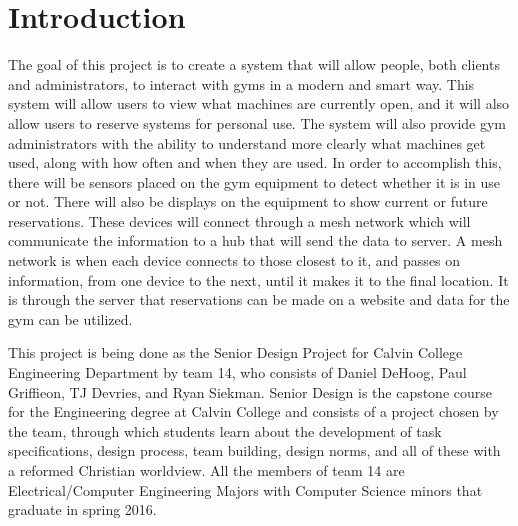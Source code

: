 \documentclass[ppfs.tex]{template/subfiles}
\begin{document}
\section{Introduction}

The goal of this project is to create a system that will allow people, both clients and administrators, to interact with gyms in a modern and smart way. This system will allow users to view what machines are currently open, and it will also allow users to reserve systems for personal use. The system will also provide gym administrators with the ability to understand more clearly what machines get used, along with how often and when they are used. In order to accomplish this, there will be sensors placed on the gym equipment to detect whether it is in use or not. There will also be displays on the equipment to show current or future reservations. These devices will connect through a mesh network which will communicate the information to a hub that will send the data to server. A mesh network is when each device connects to those closest to it, and passes on information, from one device to the next, until it makes it to the final location. It is through the server that reservations can be made on a website and data for the gym can be utilized. 

This project is being done as the Senior Design Project for Calvin College Engineering Department by team 14, who consists of Daniel DeHoog, Paul Griffieon, TJ Devries, and Ryan Siekman. Senior Design is the capstone course for the Engineering degree at Calvin College and consists of a project chosen by the team, through which students learn about the development of task specifications, design process, team building, design norms, and all of these with a reformed Christian worldview. All the members of team 14 are Electrical/Computer Engineering Majors with Computer Science minors that graduate in spring 2016. 
\end{document}
